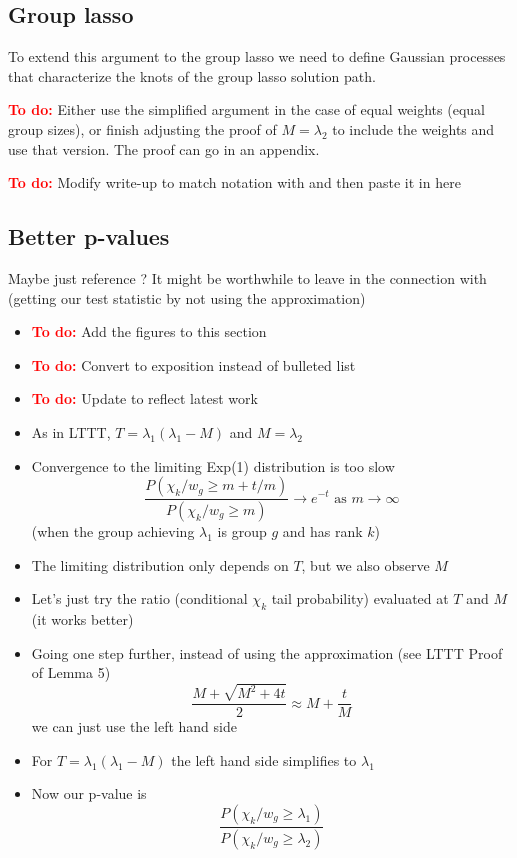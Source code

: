 \documentclass{imsart}
\newcommand{\todo}{\textcolor{red}{\textbf{To do: }}}
\begin{document}
\subsection{Group lasso}
To extend this argument to the group lasso we need to define Gaussian
processes that characterize the knots of the group lasso solution
path.  

\todo Either use the simplified argument in the case of equal weights
(equal group sizes), or finish adjusting the proof of $M = \lambda_2$
to include the weights and use that version. The proof can go in an
appendix. 

\todo Modify write-up to match notation with \cite{tests:adaptive} and
then paste it in here

\subsection{Better p-values}

Maybe just reference \cite{tests:adaptive}? It might be worthwhile to
leave in the connection with \cite{significance:lasso} (getting our
test statistic by not using the approximation)

\begin{itemize}

\item \todo Add the figures to this section
\item \todo Convert to exposition instead of bulleted list
\item \todo Update to reflect latest work
  \item As in LTTT, $T = \lambda_1 (\lambda_1 - M)$ and $M = \lambda_2$
  \item Convergence to the limiting Exp(1) distribution is too slow
    \[
      \frac{P(\chi_k / w_g \geq m + t/m)}{P(\chi_k / w_g \geq m)} \to e^{-t} \text{ as } m \to \infty
    \]
    (when the group achieving $\lambda_1$ is group $g$ and has rank $k$)
  \item The limiting distribution only depends on $T$, but we also observe $M$
  \item Let's just try the ratio (conditional $\chi_k$ tail probability) evaluated at $T$ and $M$ (it works better)
  \item Going one step further, instead of using the approximation (see LTTT Proof of Lemma 5)
    \[
      \frac{M + \sqrt{M^2+4t}}{2} \approx M + \frac{t}{M}
    \]
    we can just use the left hand side
  \item For $T = \lambda_1(\lambda_1 - M)$ the left hand side simplifies to $\lambda_1$
  \item Now our p-value is
    \[
      \frac{P(\chi_k / w_g \geq \lambda_1)}{P(\chi_k / w_g \geq \lambda_2)}
    \]   
\end{itemize}
\end{document}
